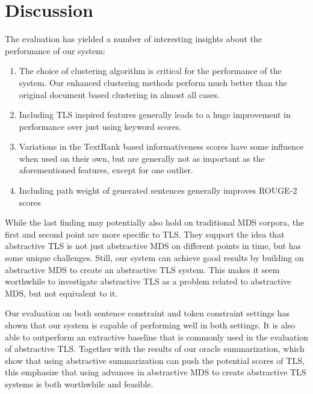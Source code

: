 \documentclass[a4paper,BCOR=10mm]{report}
\numberwithin{lemma}{chapter}
\numberwithin{definition}{chapter}
\begin{document}
%

\section{Discussion}

The evaluation has yielded a number of interesting insights about the performance of our system:

\begin{enumerate}
    \item{The choice of clustering algorithm is critical for the performance of the system. Our enhanced clustering methods perform much better than the original document based clustering in almost all cases.}
    \item{Including TLS inspired features generally leads to a huge improvement in performance over just using keyword scores.}
    \item{Variations in the TextRank based informativeness scores have some influence when used on their own, but are generally not as important as the aforementioned features, except for one outlier.}
    \item{Including path weight of generated sentences generally improves ROUGE-2 scores}
\end{enumerate}

While the last finding may potentially also hold on traditional MDS corpora, the first and second point are more specific to TLS.
They support the idea that abstractive TLS is not just abstractive MDS on different points in time, but has some unique challenges.
Still, our system can achieve good results by building on abstractive MDS to create an abstractive TLS system.
This makes it seem worthwhile to investigate abstractive TLS as a problem related to abstractive MDS, but not equivalent to it.

Our evaluation on both sentence constraint and token constraint settings has shown that our system is capable of performing well in both settings. It is also able to outperform an extractive baseline that is commonly used in the evaluation of abstractive TLS.
Together with the results of our oracle summarization, which show that using abstractive summarization can push the potential scores of TLS, this emphasize that using advances in abstractive MDS to create abstractive TLS systems is both worthwhile and feasible.
\end{document}
